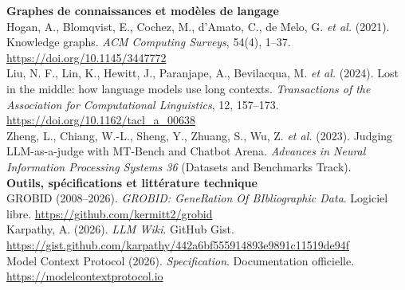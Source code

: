 \documentclass[11pt,a4paper]{article}
\begin{document}
{\textbf{Graphes de connaissances et modèles de langage}\\[0.15cm]

Hogan, A., Blomqvist, E., Cochez, M., d'Amato, C., de Melo, G. \textit{et al.} (2021). Knowledge graphs. \textit{ACM Computing Surveys}, 54(4), 1--37. \url{https://doi.org/10.1145/3447772}\\[0.2cm]

Liu, N. F., Lin, K., Hewitt, J., Paranjape, A., Bevilacqua, M. \textit{et al.} (2024). Lost in the middle: how language models use long contexts. \textit{Transactions of the Association for Computational Linguistics}, 12, 157--173. \url{https://doi.org/10.1162/tacl_a_00638}\\[0.2cm]

Zheng, L., Chiang, W.-L., Sheng, Y., Zhuang, S., Wu, Z. \textit{et al.} (2023). Judging LLM-as-a-judge with MT-Bench and Chatbot Arena. \textit{Advances in Neural Information Processing Systems 36} (Datasets and Benchmarks Track).\\[0.4cm]

\textbf{Outils, spécifications et littérature technique}\\[0.15cm]

GROBID (2008--2026). \textit{GROBID: GeneRation Of BIbliographic Data}. Logiciel libre. \url{https://github.com/kermitt2/grobid}\\[0.2cm]

Karpathy, A. (2026). \textit{LLM Wiki}. GitHub Gist. \url{https://gist.github.com/karpathy/442a6bf555914893e9891c11519de94f}\\[0.2cm]

Model Context Protocol (2026). \textit{Specification}. Documentation officielle. \url{https://modelcontextprotocol.io}\\[0.2cm]

}
\end{document}
